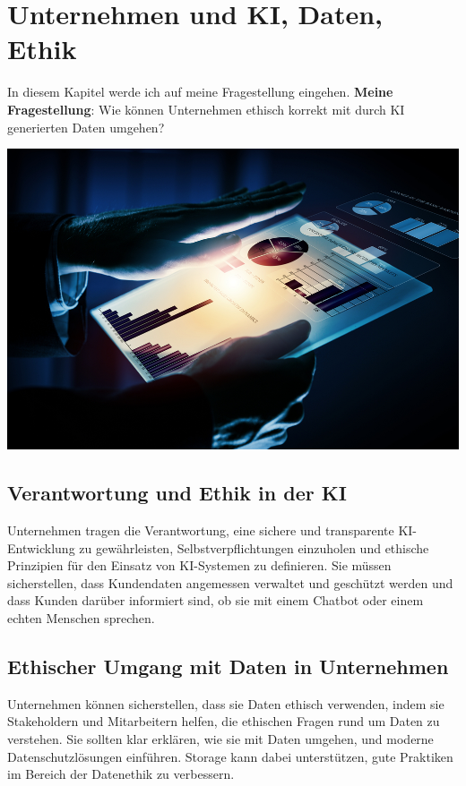 \chapter{Unternehmen und KI, Daten, Ethik}
\label{chap:methode}

In diesem Kapitel werde ich auf meine Fragestellung eingehen.
\newline
\textbf{Meine Fragestellung}:
\newline
Wie können Unternehmen ethisch korrekt mit durch KI generierten Daten umgehen?

\vspace{4mm}

\includegraphics[width=1.0\textwidth]{Verantwortung.jpeg}

\newpage

\section{Verantwortung und Ethik in der KI}
Unternehmen tragen die Verantwortung, eine sichere und transparente KI-Entwicklung zu gewährleisten, Selbstverpflichtungen einzuholen und ethische Prinzipien für den Einsatz von KI-Systemen zu definieren. Sie müssen sicherstellen, dass Kundendaten angemessen verwaltet und geschützt werden und dass Kunden darüber informiert sind, ob sie mit einem Chatbot oder einem echten Menschen sprechen.
\citep{ai-res-cmm360}

\section{Ethischer Umgang mit Daten in Unternehmen}

Unternehmen können sicherstellen, dass sie Daten ethisch verwenden, indem sie Stakeholdern und Mitarbeitern helfen, die ethischen Fragen rund um Daten zu verstehen. Sie sollten klar erklären, wie sie mit Daten umgehen, und moderne Datenschutzlösungen einführen. Storage kann dabei unterstützen, gute Praktiken im Bereich der Datenethik zu verbessern.
\citep{ai-ethik-pure}

